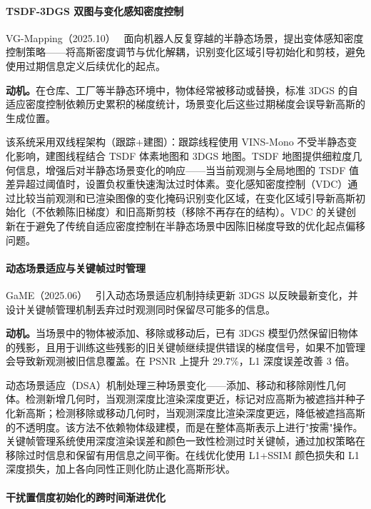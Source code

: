 \paragraph{TSDF-3DGS 双图与变化感知密度控制}

VG-Mapping（2025.10）~\cite{2510_09962} 面向机器人反复穿越的半静态场景，提出变体感知密度控制策略——将高斯密度调节与优化解耦，识别变化区域引导初始化和剪枝，避免使用过期信息定义后续优化的起点。

\textbf{动机。}在仓库、工厂等半静态环境中，物体经常被移动或替换，标准 3DGS 的自适应密度控制依赖历史累积的梯度统计，场景变化后这些过期梯度会误导新高斯的生成位置。

该系统采用双线程架构（跟踪+建图）：跟踪线程使用 VINS-Mono 不受半静态变化影响，建图线程结合 TSDF 体素地图和 3DGS 地图。TSDF 地图提供细粒度几何信息，增强后对半静态场景变化的响应——当当前观测与全局地图的 TSDF 值差异超过阈值时，设置负权重快速淘汰过时体素。变化感知密度控制（VDC）通过比较当前观测和已渲染图像的变化掩码识别变化区域，在变化区域引导新高斯初始化（不依赖陈旧梯度）和旧高斯剪枝（移除不再存在的结构）。VDC 的关键创新在于避免了传统自适应密度控制在半静态场景中因陈旧梯度导致的优化起点偏移问题。

\paragraph{动态场景适应与关键帧过时管理}

GaME（2025.06）~\cite{2506_06909} 引入动态场景适应机制持续更新 3DGS 以反映最新变化，并设计关键帧管理机制丢弃过时观测同时保留尽可能多的信息。

\textbf{动机。}当场景中的物体被添加、移除或移动后，已有 3DGS 模型仍然保留旧物体的残影，且用于训练这些残影的旧关键帧继续提供错误的梯度信号，如果不加管理会导致新观测被旧信息覆盖。在 PSNR 上提升 29.7\%，L1 深度误差改善 3 倍。

动态场景适应（DSA）机制处理三种场景变化——添加、移动和移除刚性几何体。检测新增几何时，当观测深度比渲染深度更近，标记对应高斯为被遮挡并种子化新高斯；检测移除或移动几何时，当观测深度比渲染深度更远，降低被遮挡高斯的不透明度。该方法不依赖物体级建模，而是在整体高斯表示上进行"按需"操作。关键帧管理系统使用深度渲染误差和颜色一致性检测过时关键帧，通过加权策略在移除过时信息和保留有用信息之间平衡。在线优化使用 L1+SSIM 颜色损失和 L1 深度损失，加上各向同性正则化防止退化高斯形状。

\paragraph{干扰置信度初始化的跨时间渐进优化}


